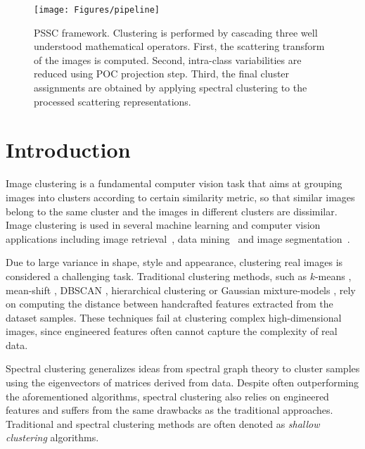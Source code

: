 \documentclass[11pt]{article}
\theoremstyle{definition}
\begin{document}
\begin{figure*}[t]
	\centering
	\texttt{[image: Figures/pipeline]}
	\caption{PSSC framework. Clustering is performed by cascading three well understood mathematical operators. First, the scattering transform of the images is computed. Second, intra-class variabilities are reduced using POC projection step. Third, the final cluster assignments are obtained by applying spectral clustering to the processed scattering representations.}
	\label{fig:clustering pipeline}
	\vspace{-0.15cm}
\end{figure*}


\section{Introduction}\label{sec:introduction}

Image clustering is a fundamental computer vision task that aims at grouping images into clusters according to certain similarity metric, so that similar images belong to the same cluster and the images in different clusters are dissimilar. Image clustering is used in several machine learning and computer vision applications including image retrieval~\cite{Chen_ContentBasedImageRetrievalClustering_2003, Murthy_ContetBasedImageRetrievalKMeansClustering_2010}, data mining~\cite{Verma_ComparativeStudyClusteringForDataMining_2012} and image segmentation~\cite{Chuang_FuzzyKMeansImageSegmentation_2006, Dhanachandra_ImageSegementationThroughClustering_2015}.

Due to large variance in shape, style and appearance, clustering real images is considered a challenging task. Traditional clustering methods, such as $k$-means \cite{Macqueen_KMeansClustering_1967}, mean-shift \cite{Comaniciu_MeanShift_2002}, DBSCAN \cite{Ester_DBSCANDensityBasedClustering_1996}, hierarchical clustering \cite{Johnson_HierarchicalClustering_1967} or Gaussian mixture-models \cite{Reynolds_GaussianMixtureModels_2009}, rely on computing the distance between handcrafted features extracted from the dataset samples. These techniques fail at clustering complex high-dimensional images, since engineered features often cannot capture the complexity of real data.

Spectral clustering \cite{Ng_SpectralClustering_2002, Luxburg_SpectralClusteringTutorial_2007} generalizes ideas from spectral graph theory to cluster samples using the eigenvectors of matrices derived from data. Despite often outperforming the aforementioned algorithms, spectral clustering also relies on engineered features and suffers from the same drawbacks as the traditional approaches. Traditional and spectral clustering methods are often denoted as \textit{shallow clustering} algorithms.
\end{document}
